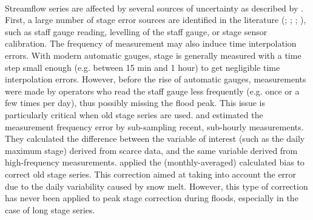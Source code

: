 \documentclass[11pt]{article}
\begin{document}
    \paragraph{}
    Streamflow series are affected by several sources of uncertainty as described by \citet{mcmillan_benchmarking_2012}. First, a large number of stage error sources are identified in the literature (\citet{van_der_made_determination_1982}; \citet{petersen-overleir_uncertainty_2005}; \citet{mcmillan_benchmarking_2012}; \citet{horner_impact_2018}), such as staff gauge reading, levelling of the staff gauge, or stage sensor calibration. The frequency of measurement may also induce time interpolation errors. With modern automatic gauges, stage is generally measured with a time step small enough (e.g. between 15 min and 1 hour) to get negligible time interpolation errors. However, before the rise of automatic gauges, measurements were made by operators who read the staff gauge less frequently (e.g. once or a few times per day), thus possibly missing the flood peak. This issue is particularly critical when old stage series are used. \citet{hamilton_quantifying_2012} and \citet{kuentz_hydrometrie_2014} estimated the measurement frequency error by sub-sampling recent, sub-hourly measurements. They calculated the difference between the variable of interest (such as the daily maximum stage) derived from scarce data, and the same variable derived from high-frequency measurements. \citet{kuentz_hydrometrie_2014} applied the (monthly-averaged) calculated bias to correct old stage series. This correction aimed at taking into account the error due to the daily variability caused by snow melt. However, this type of correction has never been applied to peak stage correction during floods, especially in the case of long stage series.
    
\end{document}
